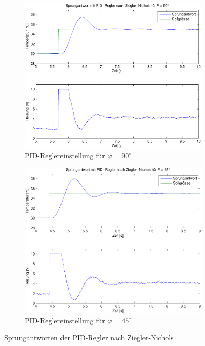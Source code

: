 \begin{figure}[h!]
	\centering
	\begin{subfigure}{0.475\textwidth}
		\includegraphics[width=1\textwidth]{06/pid_zn_full_plot.pdf}
		\caption{PID-Reglereinstellung für $\varphi = 90^\circ$}
	\end{subfigure}
	\begin{subfigure}{0.475\textwidth}
		\includegraphics[width=1\textwidth]{06/pid_zn_half_plot.pdf}
		\caption{PID-Reglereinstellung für $\varphi = 45^\circ$}
	\end{subfigure}
	\caption{Sprungantworten der PID-Regler nach Ziegler-Nichols}
\end{figure}

